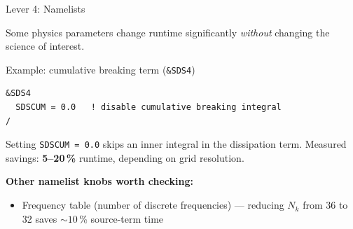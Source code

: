 \documentclass[aspectratio=169,10pt]{beamer}
\begin{document}
\begin{frame}[fragile,shrink=8]{Lever 4: Namelists}

  Some physics parameters change runtime significantly \emph{without}
  changing the science of interest.

  \vspace{0.4em}
  \begin{exampleblock}{Example: cumulative breaking term (\texttt{\&SDS4})}
\begin{lstlisting}[language={}]
&SDS4
  SDSCUM = 0.0   ! disable cumulative breaking integral
/
\end{lstlisting}
    Setting \texttt{SDSCUM = 0.0} skips an inner integral in the dissipation
    term.  Measured savings: \textbf{5--20\,\%} runtime,
    depending on grid resolution.
  \end{exampleblock}

  \vspace{0.4em}
  \textbf{Other namelist knobs worth checking:}
  \begin{itemize}
    \item Frequency table (number of discrete frequencies) ---
          reducing $N_k$ from 36 to 32 saves $\sim\!10$\,\% source-term time
  \end{itemize}
\end{frame}
\end{document}
